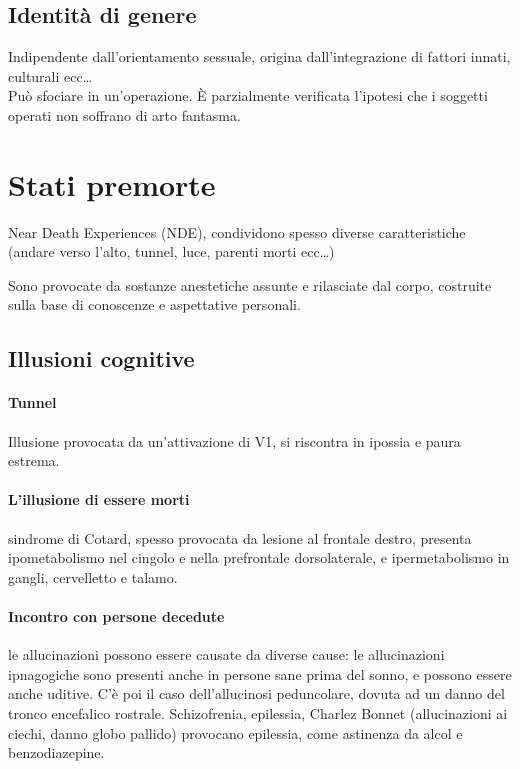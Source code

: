 \documentclass[12pt, a4paper]{article}
\begin{document}
\subsection{Identità di genere} 

Indipendente dall'orientamento sessuale, origina dall'integrazione di fattori innati, culturali ecc\ldots
\medskip\\  
Può sfociare in un'operazione. È parzialmente verificata l'ipotesi che i sog\-getti operati non soffrano di arto fantasma.

\section{Stati premorte}

Near Death Experiences (NDE), condividono spesso diverse caratteristiche (andare verso l'alto, tunnel, luce, parenti morti ecc\ldots)


Sono provocate da sostanze anestetiche assunte e rilasciate dal corpo, costruite sulla base di conoscenze e aspettative personali.

\subsection{Illusioni cognitive} 

\paragraph{Tunnel} Illusione provocata da un'attivazione di V1, si riscontra in ipossia e paura estrema.

\paragraph{L'illusione di essere morti} sindrome di Cotard, spesso provocata da lesione al frontale destro, presenta ipometabolismo nel cingolo e nella prefrontale dorsolaterale, e ipermetabolismo in gangli, cervelletto e talamo.

\paragraph{Incontro con persone decedute} le allucinazioni possono essere causate da diverse cause: le allucinazioni ipnagogiche sono presenti anche in persone sane prima del sonno, e possono essere anche uditive. C'è poi il caso dell'allucinosi peduncolare, dovuta ad un danno del tronco encefalico rostrale. Schizofrenia, epilessia, Charlez Bonnet (allucinazioni ai ciechi, danno globo pallido) provocano epilessia, come astinenza da alcol e benzodiazepine.
\end{document}
